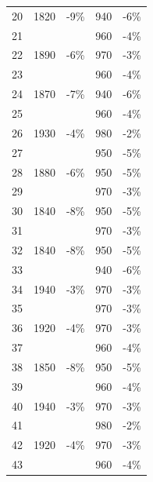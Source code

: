 \documentclass{scrartcl}
\begin{document}
\begin{longtable}{|r|l|r|r|r|}
    20    & 1820  & \cellcolor[rgb]{ 1,  .922,  .612}\textcolor[rgb]{ .612,  .341,  0}{-9\%} & 940   & \cellcolor[rgb]{ 1,  .922,  .612}\textcolor[rgb]{ .612,  .341,  0}{-6\%} \\
    21    &       &       & 960   & -4\% \\
    22    & 1890  & -6\%  & 970   & -3\% \\
    23    &       &       & 960   & -4\% \\
    24    & 1870  & \cellcolor[rgb]{ 1,  .922,  .612}\textcolor[rgb]{ .612,  .341,  0}{-7\%} & 940   & \cellcolor[rgb]{ 1,  .922,  .612}\textcolor[rgb]{ .612,  .341,  0}{-6\%} \\
    25    &       &       & 960   & -4\% \\
    26    & 1930  & -4\%  & 980   & -2\% \\
    27    &       &       & 950   & -5\% \\
    28    & 1880  & \cellcolor[rgb]{ 1,  .922,  .612}\textcolor[rgb]{ .612,  .341,  0}{-6\%} & 950   & -5\% \\
    29    &       &       & 970   & -3\% \\
    30    & 1840  & \cellcolor[rgb]{ 1,  .922,  .612}\textcolor[rgb]{ .612,  .341,  0}{-8\%} & 950   & -5\% \\
    31    &       &       & 970   & -3\% \\
    32    & 1840  & \cellcolor[rgb]{ 1,  .922,  .612}\textcolor[rgb]{ .612,  .341,  0}{-8\%} & 950   & -5\% \\
    33    &       &       & 940   & \cellcolor[rgb]{ 1,  .922,  .612}\textcolor[rgb]{ .612,  .341,  0}{-6\%} \\
    34    & 1940  & -3\%  & 970   & -3\% \\
    35    &       &       & 970   & -3\% \\
    36    & 1920  & -4\%  & 970   & -3\% \\
    37    &       &       & 960   & -4\% \\
    38    & 1850  & \cellcolor[rgb]{ 1,  .922,  .612}\textcolor[rgb]{ .612,  .341,  0}{-8\%} & 950   & -5\% \\
    39    &       &       & 960   & -4\% \\
    40    & 1940  & -3\%  & 970   & -3\% \\
    41    &       &       & 980   & -2\% \\
    42    & 1920  & -4\%  & 970   & -3\% \\
    43    &       &       & 960   & -4\% \\

\end{longtable}
\end{document}
